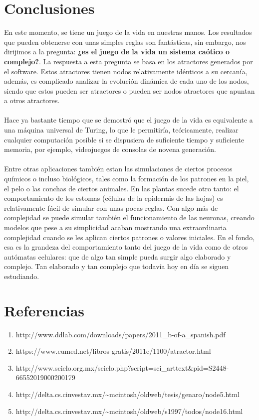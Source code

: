 \documentclass[12pt,a4paper]{book}
\begin{document}
	\inputminted{python}{Life9.py}
	
	
	\chapter{Conclusiones}
	En este momento, se tiene un juego de la vida en nuestras manos. Los resultados que pueden obtenerse con
	unas simples reglas son fantásticas, sin embargo, nos dirijimos a la pregunta: \textbf{¿es el juego de la vida un sistema caótico o complejo?}. La respuesta a esta pregunta se basa en los atractores generados por el software. Estos atractores tienen nodos relativamente idénticos a su cercanía, además, es complicado analizar la evolución dinámica de cada uno de los nodos, siendo que estos pueden ser atractores o pueden ser nodos atractores que apuntan a otros atractores. \\\\
	Hace ya bastante tiempo que se demostró que el juego de la vida es equivalente a una máquina universal de
	Turing, lo que le permitiría, teóricamente, realizar cualquier computación posible si se dispusiera de suficiente
	tiempo y suficiente memoria, por ejemplo, videojuegos de consolas de novena generación.\\\\
	Entre otras aplicaciones también estan las simulaciones de ciertos procesos químicos o incluso biológicos,
	tales como la formación de los patrones en la piel, el pelo o las conchas de ciertos animales. En las plantas
	sucede otro tanto: el comportamiento de los estomas (células de la epidermis de las hojas) es relativamente fácil
	de simular con unas pocas reglas. Con algo más de complejidad se puede simular también el funcionamiento
	de las neuronas, creando modelos que pese a su simplicidad acaban mostrando una extraordinaria complejidad
	cuando se les aplican ciertos patrones o valores iniciales.
	En el fondo, esa es la grandeza del comportamiento tanto del juego de la vida como de otros autómatas
	celulares: que de algo tan simple pueda surgir algo elaborado y complejo. Tan elaborado y tan complejo que
	todavía hoy en día se siguen estudiando.
	\chapter{Referencias}
	\begin{enumerate}
		\item http://www.ddlab.com/downloads/papers/2011\_b-of-a\_spanish.pdf
		\item https://www.eumed.net/libros-gratis/2011e/1100/atractor.html
		\item http://www.scielo.org.mx/scielo.php?script=sci\_arttext\&pid=S2448-66552019000200179
		\item http://delta.cs.cinvestav.mx/\textasciitilde{}mcintosh/oldweb/tesis/genaro/node5.html
		\item http://delta.cs.cinvestav.mx/\textasciitilde{}mcintosh/oldweb/s1997/todos/node16.html
	\end{enumerate}
\end{document}
